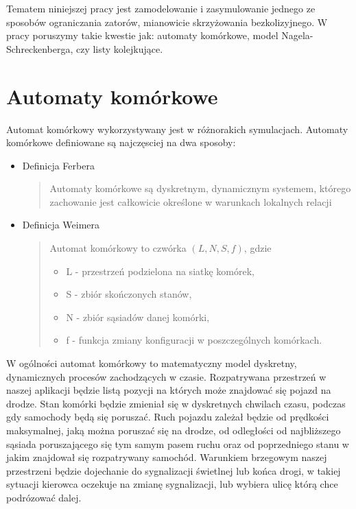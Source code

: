 \documentclass{sprawozdanie-agh}
\begin{document}
\begin{multicols}{2}
		Tematem niniejszej pracy jest zamodelowanie i zasymulowanie jednego ze sposobów ograniczania zatorów, mianowicie skrzyżowania bezkolizyjnego. W pracy poruszymy takie kwestie jak: automaty komórkowe, model Nagela-Schreckenberga, czy listy kolejkujące.

		\section{Automaty komórkowe}

		Automat komórkowy wykorzystywany jest w różnorakich symulacjach. Automaty komórkowe definiowane są najczęsciej na dwa sposoby:

		\begin{itemize}
			\item Definicja Ferbera
			\begin{quote}
				Automaty komórkowe są dyskretnym, dynamicznym systemem, którego zachowanie jest całkowicie określone w warunkach lokalnych relacji
			\end{quote}
			\item Definicja Weimera
			\begin{quote}
				Automat komórkowy to czwórka $(L,N,S,f)$, gdzie
				\begin{itemize}
					\item L - przestrzeń podzielona na siatkę komórek,
					\item S - zbiór skończonych stanów,
					\item N - zbiór sąsiadów danej komórki,
					\item f - funkcja zmiany konfiguracji w poszczególnych komórkach.
				\end{itemize}
			\end{quote}
		\end{itemize}

		W ogólności automat komórkowy to matematyczny model dyskretny, dynamicznych procesów zachodzących w czasie. Rozpatrywana przestrzeń w naszej aplikacji będzie listą pozycji na których może znajdować się pojazd na drodze. Stan komórki będzie zmieniał się w dyskretnych chwilach czasu, podczas gdy samochody będą się poruszać. Ruch pojazdu zależał będzie od prędkości maksymalnej, jaką można poruszać się na drodze, od odległości od najbliższego sąsiada poruszającego się tym samym pasem ruchu oraz od poprzedniego stanu w jakim znajdował się rozpatrywany samochód. Warunkiem brzegowym naszej przestrzeni będzie dojechanie do sygnalizacji świetlnej lub końca drogi, w takiej sytuacji kierowca oczekuje na zmianę sygnalizacji, lub wybiera ulicę którą chce podrózować dalej.


\end{multicols}
\end{document}
